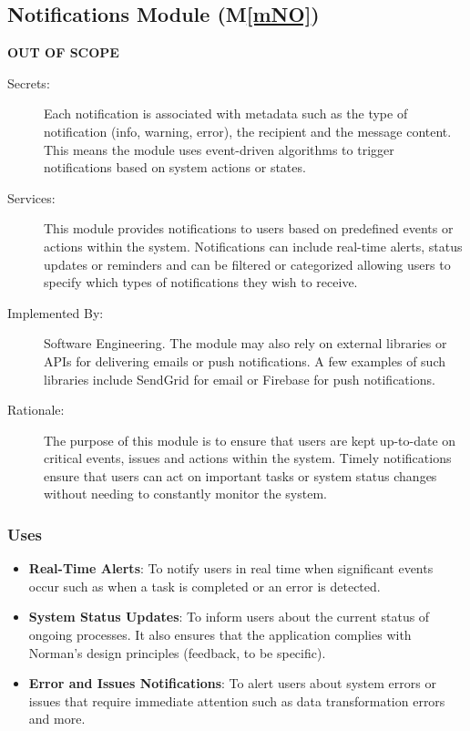\documentclass[12pt, titlepage]{article}
\newcommand{\mref}[1]{M\ref{#1}}
\begin{document}
\subsection{Notifications Module (\mref{mNO})}
\textbf{OUT OF SCOPE}
\begin{description}
  \item[Secrets:] Each notification is associated with metadata such as the type of notification 
  (info, warning, error), the recipient and the message content. This means the module uses 
  event-driven algorithms to trigger notifications based on system actions or states. 
  \item[Services:] This module provides notifications to users based on predefined events or actions 
  within the system. Notifications can include real-time alerts, status updates or reminders and 
  can be filtered or categorized allowing users to specify which types of notifications they 
  wish to receive.
  \item[Implemented By:] Software Engineering. The module may also rely on external libraries or APIs 
  for delivering emails or push notifications. A few examples of such libraries include SendGrid for email 
  or Firebase for push notifications.
  \item[Rationale:] The purpose of this module is to ensure that users are kept up-to-date on critical 
  events, issues and actions within the system. Timely notifications ensure that users can act on 
  important tasks or system status changes without needing to constantly monitor the system.
\end{description}

\subsubsection{Uses}
\begin{itemize}
  \item \textbf{Real-Time Alerts}: To notify users in real time when significant events occur such as 
  when a task is completed or an error is detected.
  \item \textbf{System Status Updates}: To inform users about the current status of ongoing processes. It 
  also ensures that the application complies with Norman's design principles (feedback, to be specific).
  \item \textbf{Error and Issues Notifications}: To alert users about system errors or issues that require 
  immediate attention such as data transformation errors and more.
\end{itemize}
\end{document}

